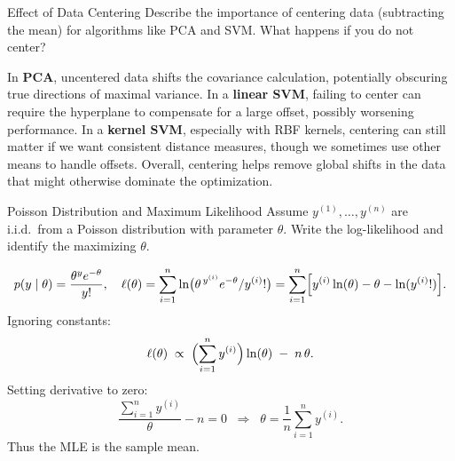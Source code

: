 \documentclass{article}
\begin{document}
\begin{exercise}{Effect of Data Centering}
  Describe the importance of centering data (subtracting the mean) for algorithms like PCA and SVM. What happens if you do not center?

  \begin{solution}
    In \textbf{PCA}, uncentered data shifts the covariance calculation, potentially obscuring true directions of maximal variance.  
    In a \textbf{linear SVM}, failing to center can require the hyperplane to compensate for a large offset, possibly worsening performance.  
    In a \textbf{kernel SVM}, especially with RBF kernels, centering can still matter if we want consistent distance measures, though we sometimes use other means to handle offsets.  
    Overall, centering helps remove global shifts in the data that might otherwise dominate the optimization.
  \end{solution}
\end{exercise}

\begin{exercise}{Poisson Distribution and Maximum Likelihood}
  Assume $y^{(1)},\dots,y^{(n)}$ are i.i.d.\ from a Poisson distribution with parameter $\theta$. Write the log-likelihood and identify the maximizing $\theta$.

  \begin{solution}
    \[
      p(y \mid \theta) = \frac{\theta^y e^{-\theta}}{y!}, 
      \quad
      \ell(\theta) 
      = \sum_{i=1}^n \ln\bigl(\theta^{\,y^{(i)}} e^{-\theta} / y^{(i)}!\bigr)
      = \sum_{i=1}^n \Bigl[y^{(i)} \ln(\theta) - \theta - \ln(y^{(i)}!)\Bigr].
    \]
    Ignoring constants:
    \[
      \ell(\theta) \;\propto\; 
      \Bigl(\sum_{i=1}^n y^{(i)}\Bigr)\ln(\theta) \;-\; n\,\theta.
    \]
    Setting derivative to zero:
    \[
      \frac{\sum_{i=1}^n y^{(i)}}{\theta} - n = 0
      \;\;\Longrightarrow\;\;
      \theta = \frac{1}{n}\sum_{i=1}^n y^{(i)}.
    \]
    Thus the MLE is the sample mean.
  \end{solution}
\end{exercise}
\end{document}
